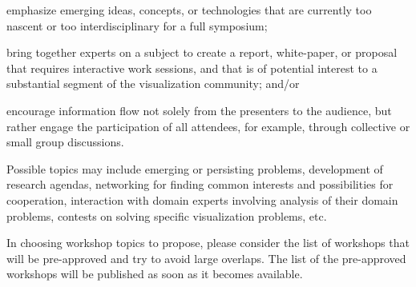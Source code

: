 \newpage \pagebreak \cleardoublepage


emphasize emerging ideas, concepts, or technologies that are currently too nascent or too interdisciplinary for a full symposium;

bring together experts on a subject to create a report, white-paper, or proposal that requires interactive work sessions, and that is of potential interest to a substantial segment of the visualization community; and/or

encourage information flow not solely from the presenters to the audience, but rather engage the participation of all attendees, for example, through collective or small group discussions.

Possible topics may include emerging or persisting problems, development of research agendas, networking for finding common interests and possibilities for cooperation, interaction with domain experts involving analysis of their domain problems, contests on solving specific visualization problems, etc.

In choosing workshop topics to propose, please consider the list of workshops that will be pre-approved and try to avoid large overlaps. The list of the pre-approved workshops will be published as soon as it becomes available.


